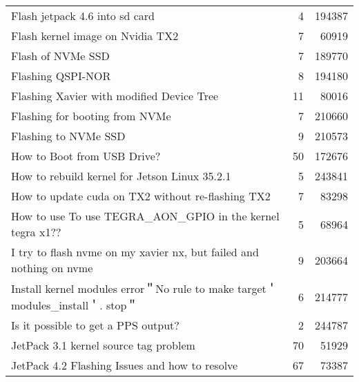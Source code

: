 \begin{longtable}{p{}rr}
    Flash jetpack 4.6 into sd card                                                                      & 4        & 194387 \\
    Flash kernel image on Nvidia TX2                                                                    & 7        & 60919  \\
    Flash of NVMe SSD                                                                                   & 7        & 189770 \\
    Flashing QSPI-NOR                                                                                   & 8        & 194180 \\
    Flashing Xavier with modified Device Tree                                                           & 11       & 80016  \\
    Flashing for booting from NVMe                                                                      & 7        & 210660 \\
    Flashing to NVMe SSD                                                                                & 9        & 210573 \\
    How to Boot from USB Drive?                                                                         & 50       & 172676 \\
    How to rebuild kernel for Jetson Linux 35.2.1                                                       & 5        & 243841 \\
    How to update cuda on TX2 without re-flashing TX2                                                   & 7        & 83298  \\
    How to use To use TEGRA\_AON\_GPIO in the kernel tegra x1??                                         & 5        & 68964  \\
    I try to flash nvme on my xavier nx, but failed and nothing on nvme                                 & 9        & 203664 \\
    Install kernel modules error＂No rule to make target＇modules\_install＇. stop＂                    & 6        & 214777 \\
    Is it possible to get a PPS output?                                                                 & 2        & 244787 \\
    JetPack 3.1 kernel source tag problem                                                               & 70       & 51929  \\
    JetPack 4.2 Flashing Issues and how to resolve                                                      & 67       & 73387  \\

\end{longtable}

